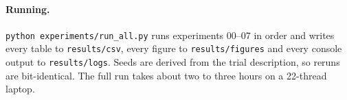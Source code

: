 \paragraph{Running.} \texttt{python experiments/run\_all.py} runs experiments 00--07 in order and writes
every table to \texttt{results/csv}, every figure to \texttt{results/figures} and every console
output to \texttt{results/logs}. Seeds are derived from the trial description, so reruns are
bit-identical. The full run takes about two to three hours on a 22-thread laptop.
